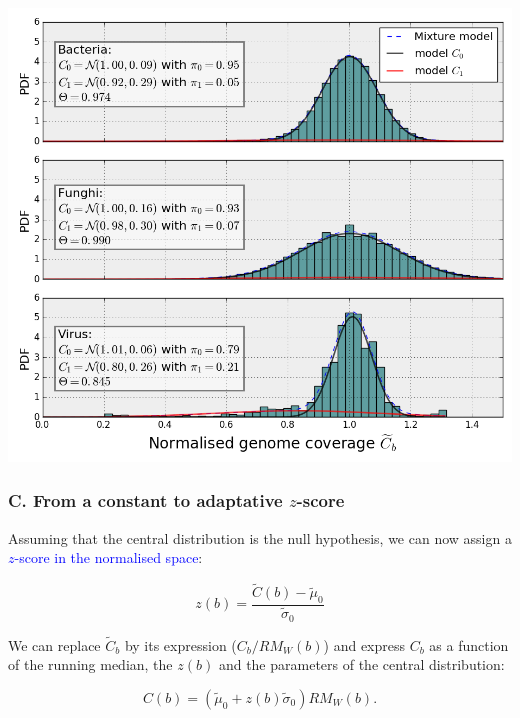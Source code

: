 \documentclass{beamer}
\begin{document}
\begin{frame}
\frametitle{}
\begin{center}
\includegraphics[height=0.9\textheight, 
    width=1\textwidth]{images/figure_em.png}
\end{center} 
\end{frame}



\begin{frame}
\frametitle{C. From a constant to adaptative $z$-score}

Assuming that the central distribution is the null hypothesis, 
we can now  assign a \textcolor{blue}{$z$-score in the normalised space}:

\begin{equation}
z(b) = \frac{\widetilde{C}(b)-\widetilde{\mu}_0}{\widetilde{\sigma}_0}
\nonumber
\end{equation}

We can  replace $\widetilde{C}_b$ by its expression  ($C_b / RM_W(b)$) and
express $C_b$ as a function of the running median, the $z(b)$ and the 
parameters 
of the central distribution:

\begin{equation}
C(b) = \left(  \widetilde{\mu}_0  + z(b) \widetilde{\sigma}_0  \right)RM_W(b).
\nonumber
\end{equation}

\end{frame}
\end{document}

